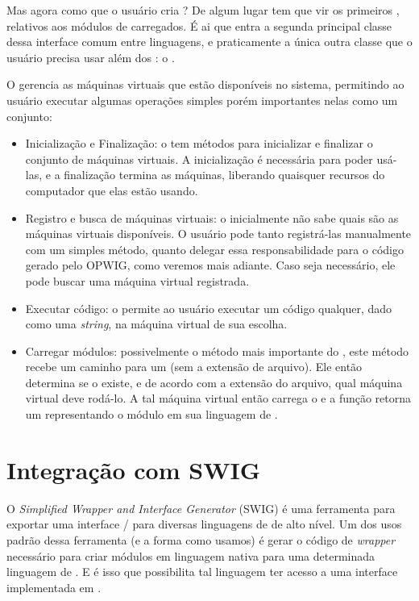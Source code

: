   Mas agora como que o usuário cria ? De algum lugar tem que vir os primeiros , relativos
  aos módulos de \script{} carregados. É ai que entra a segunda principal classe dessa interface comum
  entre linguagens, e praticamente a única outra classe que o usuário precisa usar além dos :
  o \SMgr{}.
  
  O \SMgr{} gerencia as máquinas virtuais que estão disponíveis no sistema, permitindo ao usuário
  executar algumas operações simples porém importantes nelas como um conjunto:
  \begin{itemize}
    \item Inicialização e Finalização: o \SMgr{} tem métodos para inicializar e finalizar o conjunto
      de máquinas virtuais. A inicialização é necessária para poder usá-las, e a finalização 
      termina as máquinas, liberando quaisquer recursos do computador que elas estão usando.
    \item Registro e busca de máquinas virtuais: o \SMgr{} inicialmente não sabe quais são as máquinas
      virtuais disponíveis. O usuário pode tanto registrá-las manualmente com um simples método, quanto
      delegar essa responsabilidade para o código gerado pelo OPWIG, como veremos mais adiante.
      Caso seja necessário, ele pode buscar uma máquina virtual registrada.
    \item Executar código: o \SMgr{} permite ao usuário executar um código qualquer, dado como uma
      \textit{string}, na máquina virtual de sua escolha.
    \item Carregar módulos: possivelmente o método mais importante do \SMgr{}, este método recebe
      um caminho para um \script{} (sem a extensão de arquivo). Ele então determina se o \script{}
      existe, e de acordo com a extensão do arquivo, qual máquina virtual deve rodá-lo. A tal máquina
      virtual então carrega o \script{} e a função retorna um \VObj{} representando o módulo em
      sua linguagem de \script{}.
  \end{itemize}
  
  \section{Integração com SWIG}
  O \emph{Simplified Wrapper and Interface Generator} (SWIG\footnotemark{}) é uma ferramenta
  para exportar uma interface \C{}/\CXX{} para diversas linguagens de \script{} de alto nível.
  Um dos usos padrão dessa ferramenta (e a forma como usamos) é gerar o código de \textit{wrapper}
  necessário para criar módulos em linguagem nativa para uma determinada linguagem de \script{}.
  E é isso que possibilita tal linguagem ter acesso a uma interface implementada em \CXX{}.
  
